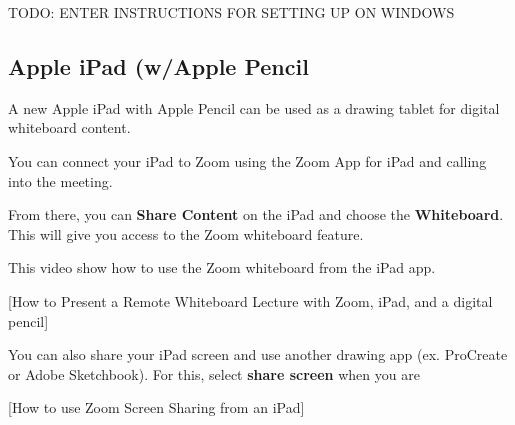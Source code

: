 \begin{gram}
\label{grm:displays::wacom::16::win-setup}

TODO: ENTER INSTRUCTIONS FOR SETTING UP ON WINDOWS
\end{gram}

\subsection{Apple iPad (w/Apple Pencil}
\label{sec:displays::idap}

\begin{gram}
\label{grm:displays::ipad}
A new Apple iPad with Apple Pencil can be used as a drawing tablet for digital whiteboard content.

\begin{gram}
You can connect your iPad to Zoom using the Zoom App for iPad and calling into the meeting. 

From there, you can \textbf{Share Content} on the iPad and choose the \textbf{Whiteboard}. This will give you access to the Zoom whiteboard feature.

This video show how to use the Zoom whiteboard from the iPad app.

\begin{gram}
[How to Present a Remote Whiteboard Lecture with Zoom, iPad, and a digital pencil]
\end{gram}

You can also share your iPad screen and use another drawing app (ex. ProCreate or Adobe Sketchbook). For this, select \textbf{share screen} when you are 

\begin{gram}
[How to use Zoom Screen Sharing from an iPad]
\end{gram}

\end{gram}



\end{gram}


